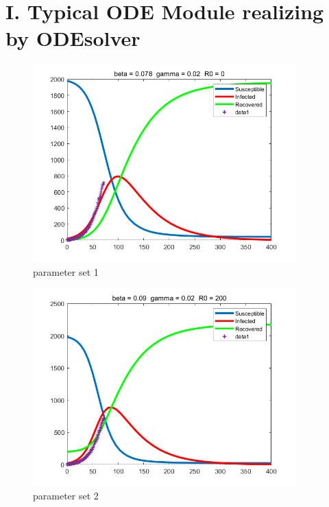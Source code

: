 \documentclass[twoside,a4paper]{article}
\begin{document}
\pagestyle{fancy}
\fancyhead{}


\section*{I. Typical ODE Module realizing by ODEsolver}
\begin{figure}[h]
\centering
\includegraphics[width=4in]{para1.png}
\caption{parameter set 1}
\end{figure}
\begin{figure}[h]
\centering
\includegraphics[width=4in]{para2.png}
\caption{parameter set 2}
\end{figure}
\end{document}
